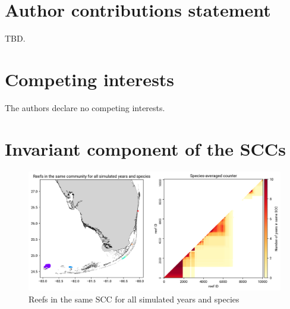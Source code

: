 \documentclass[preprint,12pt,authoryear]{elsarticle}
\begin{document}
\section*{Author contributions statement}

TBD.

\section*{Competing interests}

The authors declare no competing interests.




\newpage
\appendix

\section{Invariant component of the SCCs}

\begin{figure}[h!]
    \centering
    \includegraphics[width=\textwidth]{figures/mean_counter.png}
    \caption{Reefs in the same SCC for all simulated years and species}\label{fig:mean_counter}
\end{figure}
\end{document}
